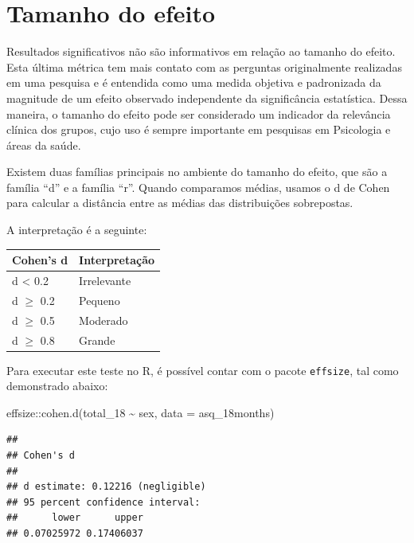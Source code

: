 \documentclass[
]{book}
\newenvironment{Shaded}{\begin{snugshade}}{\end{snugshade}}
\newcommand{\AttributeTok}[1]{\textcolor[rgb]{0.77,0.63,0.00}{#1}}
\newcommand{\FunctionTok}[1]{\textcolor[rgb]{0.00,0.00,0.00}{#1}}
\newcommand{\NormalTok}[1]{#1}
\newcommand{\SpecialCharTok}[1]{\textcolor[rgb]{0.00,0.00,0.00}{#1}}
\begin{document}
\hypertarget{tamanho-do-efeito-1}{%
\section{Tamanho do efeito}\label{tamanho-do-efeito-1}}

Resultados significativos não são informativos em relação ao tamanho do efeito. Esta última métrica tem mais contato com as perguntas originalmente realizadas em uma pesquisa e é entendida como uma medida objetiva e padronizada da magnitude de um efeito observado independente da significância estatística. Dessa maneira, o tamanho do efeito pode ser considerado um indicador da relevância clínica dos grupos, cujo uso é sempre importante em pesquisas em Psicologia e áreas da saúde.

Existem duas famílias principais no ambiente do tamanho do efeito, que são a família ``d'' e a família ``r''. Quando comparamos médias, usamos o d de Cohen para calcular a distância entre as médias das distribuições sobrepostas.

A interpretação é a seguinte:

\begin{longtable}[]{@{}ll@{}}
\toprule
Cohen's d & Interpretação \\
\midrule
\endhead
d \textless{} 0.2 & Irrelevante \\
d \(\geq\) 0.2 & Pequeno \\
d \(\geq\) 0.5 & Moderado \\
d \(\geq\) 0.8 & Grande \\
\bottomrule
\end{longtable}

Para executar este teste no R, é possível contar com o pacote \texttt{effsize}, tal como demonstrado abaixo:

\begin{Shaded}
\begin{Highlighting}[]
\NormalTok{effsize}\SpecialCharTok{::}\FunctionTok{cohen.d}\NormalTok{(total\_18 }\SpecialCharTok{\textasciitilde{}}\NormalTok{ sex, }\AttributeTok{data =}\NormalTok{ asq\_18months)}
\end{Highlighting}
\end{Shaded}

\begin{verbatim}
## 
## Cohen's d
## 
## d estimate: 0.12216 (negligible)
## 95 percent confidence interval:
##      lower      upper 
## 0.07025972 0.17406037
\end{verbatim}
\end{document}
